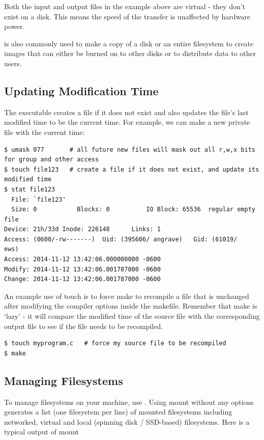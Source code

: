 Both the input and output files in the example above are virtual - they don't exist on a disk.
This means the speed of the transfer is unaffected by hardware power.

 is also commonly used to make a copy of a disk or an entire filesystem to create images that can either be burned on to other disks or to distribute data to other users.

\subsection{Updating Modification Time}

The  executable creates a file if it does not exist and also updates the file's last modified time to be the current time.
For example, we can make a new private file with the current time:

\begin{verbatim}
$ umask 077       # all future new files will mask out all r,w,x bits for group and other access
$ touch file123   # create a file if it does not exist, and update its modified time
$ stat file123
  File: `file123'
  Size: 0           Blocks: 0          IO Block: 65536  regular empty file
Device: 21h/33d Inode: 226148      Links: 1
Access: (0600/-rw-------)  Uid: (395606/ angrave)   Gid: (61019/     ews)
Access: 2014-11-12 13:42:06.000000000 -0600
Modify: 2014-11-12 13:42:06.001787000 -0600
Change: 2014-11-12 13:42:06.001787000 -0600
\end{verbatim}

An example use of touch is to force make to recompile a file that is unchanged after modifying the compiler options inside the makefile.
Remember that make is `lazy' - it will compare the modified time of the source file with the corresponding output file to see if the file needs to be recompiled.

\begin{verbatim}
$ touch myprogram.c   # force my source file to be recompiled
$ make
\end{verbatim}

\subsection{Managing Filesystems}

To manage filesystems on your machine, use .
Using mount without any options generates a list (one filesystem per line) of mounted filesystems including networked, virtual and local (spinning disk / SSD-based) filesystems.
Here is a typical output of mount

